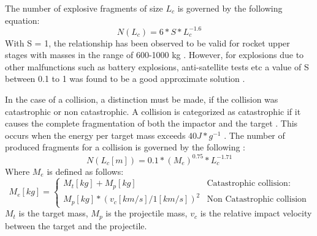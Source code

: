 \documentclass{article}
\begin{document}
The number of explosive fragments of size $L_c$ is governed by the following equation:
\begin{equation}
	N(L_c) =6*S * L_c^{-1.6}
\end{equation}
With S = 1, the relationship has been observed to be valid for rocket upper stages with masses in the range of 600-1000 kg \citep{johnson_nasas_2001}. However, for explosions due to other malfunctions such as battery explosions, anti-satellite tests etc a value of S between 0.1 to 1 was found to be a good approximate solution \citep{krisko_proper_2011} .

In the case of a collision, a distinction must be made, if the collision was catastrophic or non catastrophic. A collision is categorized as catastrophic if it causes the complete fragmentation of both the impactor and the target \citep{letizia_space_2016}. This occurs when the energy per target mass exceeds $40 J * g^{-1}$ \citep{krisko_proper_2011}. The number of produced fragments for a collision is governed by the following :
\begin{equation}
	N(L_c [m]) = 0.1 * (M_e)^{0.75} * L_c^{-1.71}
\end{equation}
Where $M_e$ is defined as follows: 
\begin{equation}
	M_e[kg] = \begin{cases}
		M_t [kg] + M_p[kg]& \text{Catastrophic collision: } \\
		 M_p[kg] * (v_c [km/s] / 1 [km/s])^2 & \text{Non Catastrophic collision}	
	\end{cases}
\end{equation}
\noindent $M_t$ is the target mass, $M_p$ is the projectile mass, $v_c$ is the relative impact velocity between the target and the projectile.
\end{document}
